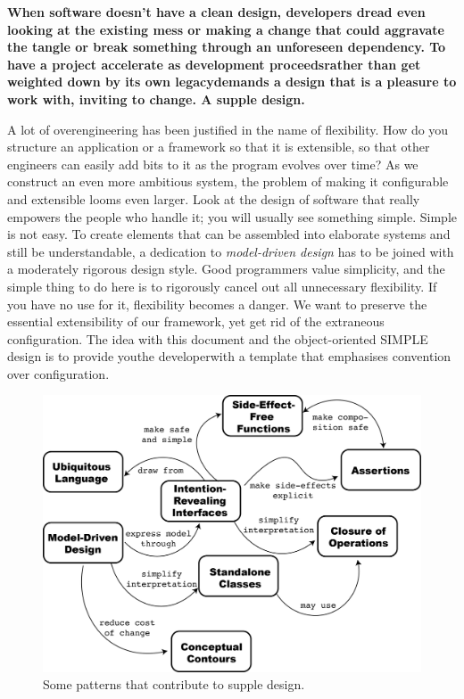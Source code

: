 \documentclass[a4paper,11pt]{article}
\begin{document}
\textbf{When software doesn't have a clean design, developers dread even looking at the existing mess or making a change that could aggravate the tangle or break something through an unforeseen dependency. To have a project accelerate as development proceeds\textemdash{}rather than get weighted down by its own legacy\textemdash{}demands a design that is a pleasure to work with, inviting to change. A supple design.}

A lot of overengineering has been justified in the name of flexibility. How do you structure an application or a framework so that it is extensible, so that other engineers can easily add bits to it as the program evolves over time? As we construct an even more ambitious system, the problem of making it configurable and extensible looms even larger. Look at the design of software that really empowers the people who handle it; you will usually see something simple. Simple is not easy. To create elements that can be assembled into elaborate systems and still be understandable, a dedication to \textit{model-driven design} has to be joined with a moderately rigorous design style. Good programmers value simplicity, and the simple thing to do here is to rigorously cancel out all unnecessary flexibility. If you have no use for it, flexibility becomes a danger. We want to preserve the essential extensibility of our framework, yet get rid of the extraneous configuration. The idea with this document and the object-oriented SIMPLE design is to provide you\textemdash{}the developer\textemdash{}with a template that emphasises convention over configuration.

\begin{figure}
\includegraphics[keepaspectratio=true,scale=0.6]{./SuppleDesign/SuppleDesign}
\caption{Some patterns that contribute to supple design.}
\end{figure}
\end{document}
